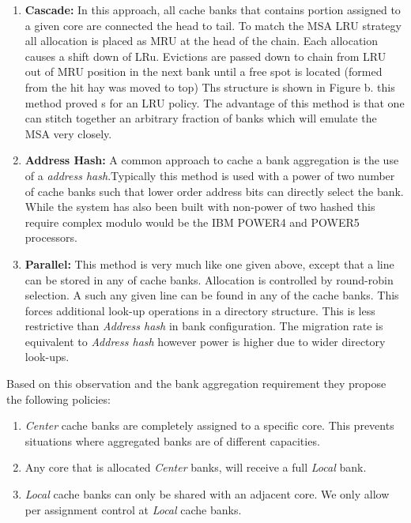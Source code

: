 \documentclass{report}
\begin{document}
\begin{enumerate}

\item \textbf{Cascade:} In this approach, all cache banks that contains portion assigned to a given core are connected the head to tail. To match the MSA LRU strategy all allocation is placed as MRU at the head of the chain. Each allocation causes a shift down of LRu. Evictions are passed down to chain from LRU out of MRU position in the next bank until a free spot is located (formed from the hit hay was moved to top) Ths structure is shown in Figure b. this method proved s for an LRU policy. The advantage of this method is that one can stitch together an arbitrary fraction of banks which will emulate the MSA very closely.

\item \textbf{Address Hash:} A common approach to cache a bank aggregation is the use of a \emph{address hash}.Typically this method is used with a power of two number of cache banks such that lower order address bits can directly select the bank. While the system has also been built with non-power of two hashed this require complex modulo would be the IBM POWER4  and POWER5 processors.

\item \textbf{Parallel:} This method is very much like one given above, except that a line can be stored in any of cache banks. Allocation is controlled by round-robin selection. A such any given line can be found in any of the cache banks. This forces additional look-up operations in a directory structure. This is less restrictive than \emph{Address hash} in bank configuration. The migration rate is equivalent to \emph{Address hash} however power is higher due to wider directory look-ups.

\end{enumerate}


Based on this observation and the bank aggregation requirement they propose the following policies:
\begin{enumerate}
\item \emph{Center} cache banks are completely assigned to a speciﬁc core. This prevents situations where aggregated banks are of different capacities. 

\item  Any core that is allocated \emph{Center} banks, will receive a full\emph{ Local} bank. 

\item \emph{Local} cache banks can only be shared with an adjacent core. We only allow per assignment control at \emph{Local} cache banks.

\end{enumerate}
\end{document}
